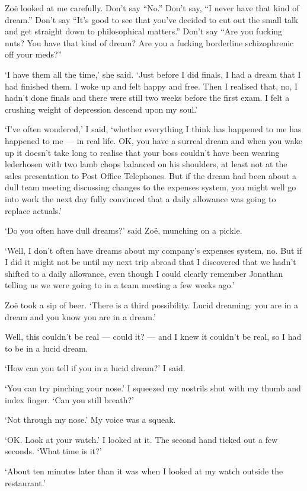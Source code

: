 Zoë looked at me carefully. Don't say ``No.'' Don't say, ``I never
have that kind of dream.'' Don't say ``It's good to see that you've
decided to cut out the small talk and get straight down to
philosophical matters.'' Don't say ``Are you fucking nuts? You have
that kind of dream? Are you a fucking borderline schizophrenic off
your meds?''

`I have them all the time,' she said. `Just before I did finals,
I had a dream that I had finished them. I woke up and felt
happy and free. Then I realised that, no, I hadn't done finals and
there were still two weeks before the first exam. I felt a
crushing weight of depression descend upon my soul.'

`I've often wondered,' I said, `whether everything I think has
happened to me has happened to me --- in real life. OK, you have a
surreal dream and when you wake up it doesn't take long to realise
that your boss couldn't have been wearing lederhosen with two lamb
chops balanced on his shoulders, at least not at the sales presentation to
Post Office Telephones. But if the dream had been about a dull team
meeting discussing changes to the expenses system, you might well go
into work the next day fully convinced that a daily allowance was
going to replace actuals.'

`Do you often have dull dreams?' said Zoë, munching on a pickle.

`Well, I don't often have dreams about my company's expenses system,
no. But if I did it might not be until my next trip abroad that I
discovered that we hadn't shifted to a daily allowance, even though I could
clearly remember Jonathan telling us we were going to in a team
meeting a few weeks ago.'

Zoë took a sip of beer. `There is a third
possibility. Lucid dreaming: you are in a dream and you know you are
in a dream.'

Well, this couldn't be real --- could it? --- and I knew it couldn't be real, so I had
to be in a lucid dream.

`How can you tell if you in a lucid dream?' I said.

`You can try pinching your nose.' I squeezed my nostrils shut with
my thumb and index finger. `Can you still breath?'

`Not through my nose.' My voice was a squeak.

`OK. Look at your watch.' I looked at it. The second hand ticked out a few seconds. `What time is it?'

`About ten minutes later than it was when I looked at my watch
outside the restaurant.'

